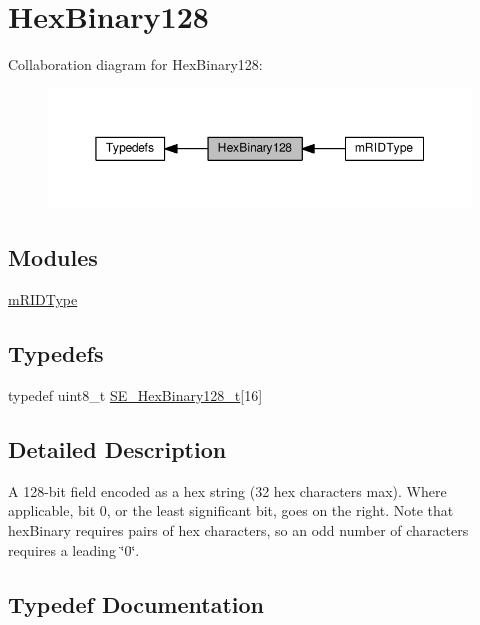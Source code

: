\hypertarget{group__HexBinary128}{}\section{Hex\+Binary128}
\label{group__HexBinary128}
Collaboration diagram for Hex\+Binary128\+:\nopagebreak
\begin{figure}[H]
\begin{center}
\leavevmode
\includegraphics[width=350pt]{group__HexBinary128}
\end{center}
\end{figure}
\subsection*{Modules}
\begin{DoxyCompactItemize}
\item 
\hyperlink{group__mRIDType}{m\+R\+I\+D\+Type}
\end{DoxyCompactItemize}
\subsection*{Typedefs}
\begin{DoxyCompactItemize}
\item 
typedef uint8\+\_\+t \hyperlink{group__HexBinary128_gae3e6f0afe8ab371017bc37a0831926c5}{S\+E\+\_\+\+Hex\+Binary128\+\_\+t}\mbox{[}16\mbox{]}
\end{DoxyCompactItemize}


\subsection{Detailed Description}
A 128-\/bit field encoded as a hex string (32 hex characters max). Where applicable, bit 0, or the least significant bit, goes on the right. Note that hex\+Binary requires pairs of hex characters, so an odd number of characters requires a leading \char`\"{}0\char`\"{}. 

\subsection{Typedef Documentation}
\mbox{\label{group__HexBinary128_gae3e6f0afe8ab371017bc37a0831926c5}} 
